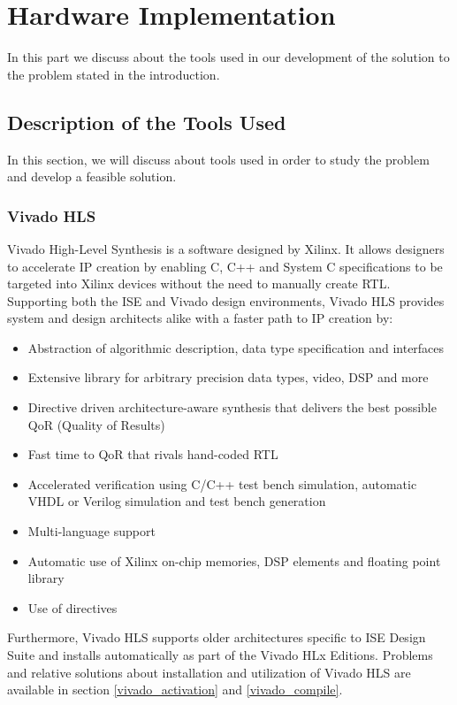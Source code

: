 \chapter{Hardware Implementation}
\label{chapter:hardware}
In this part we discuss about the tools used in our development of the solution to the problem stated in the introduction.

\section{Description of the Tools Used}

In this section, we will discuss about tools used in order to study the problem and develop a feasible solution.

\subsection{Vivado HLS}

Vivado High-Level Synthesis\cite{vivado_hls} is a software designed by Xilinx. It allows designers to accelerate IP creation by enabling C, C++ and System C specifications to be targeted into Xilinx devices without the need to manually create RTL. Supporting both the ISE\cite{ise} and Vivado design environments, Vivado HLS provides system and design architects alike with a faster path to IP creation by:

\begin{itemize}[noitemsep]
	\item Abstraction of algorithmic description, data type specification and interfaces
	\item Extensive library for arbitrary precision data types, video, DSP and more
	\item Directive driven architecture-aware synthesis that delivers the best possible QoR (Quality of Results)
	\item Fast time to QoR that rivals hand-coded RTL
	\item Accelerated verification using C/C++ test bench simulation, automatic VHDL or Verilog simulation and test bench generation
	\item Multi-language support
	\item Automatic use of Xilinx on-chip memories, DSP elements and floating point library
	\item Use of directives
\end{itemize}
Furthermore, Vivado HLS supports older architectures specific to ISE Design Suite and installs automatically as part of the Vivado HLx Editions. Problems and relative solutions about installation and utilization of Vivado HLS are available in section \ref{vivado_activation} and \ref{vivado_compile}.


